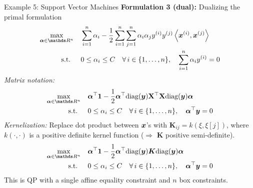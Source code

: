 \documentclass[11pt,compress,t,notes=noshow, xcolor=table]{beamer}
\begin{document}
\begin{framev}[fs=footnotesize]{Example 5: Support Vector Machines}
\textbf{Formulation 3 (dual): } Dualizing the primal formulation
$$
\begin{aligned}
\max\limits_{\bm{\alpha} \in \R^n} \quad & \sum_{i=1}^n \alpha_i - \frac{1}{2}\sum_{i=1}^n\sum_{j=1}^n\alpha_i\alpha_j\yi y^{(j)} \scp{\xi}{\xv^{(j)}} \\
\text{s.t. } \quad & 0 \le \alpha_i \le C \quad \forall\, i \in \nset, \quad \sum_{i=1}^n \alpha_i \yi = 0
\end{aligned}
$$
\spacer
\textit{Matrix notation:}
$$
\begin{aligned}
\max\limits_{\bm{\alpha} \in \R^n} \quad & \bm{\alpha}^\top \bm{1} - \frac{1}{2} \bm{\alpha}^\top \text{diag}(\bm{y}) \Xmat^\top \Xmat \text{diag}(\bm{y})\bm{\alpha} \\
\text{s.t. } \quad & 0 \le \alpha_i \le C \quad \forall\, i \in \nset, \quad \bm{\alpha}^\top \bm{y} = 0
\end{aligned}
$$
\textit{Kernelization:}
Replace dot product between $\bm{x}$'s with $\bm{K}_{ij} = k(\xi, \xi[j])$, where $k(\cdot,\cdot)$ is a positive definite kernel function ($\Rightarrow$ $\bm{K}$ positive semi-definite).
\spacer
$$
\begin{aligned}
\max\limits_{\bm{\alpha} \in \R^n} \quad & \bm{\alpha}^\top \bm{1} - \frac{1}{2} \bm{\alpha}^\top \text{diag}(\bm{y}) \bm{K} \text{diag}(\bm{y})\bm{\alpha} \\
\text{s.t. } \quad & 0 \le \alpha_i \le C \quad \forall\, i \in \nset, \quad \bm{\alpha}^\top \bm{y} = 0
\end{aligned}
$$
\spacer
This is QP with a single affine equality constraint and $n$ box constraints.
\end{framev}

\endlecture
\end{document}
